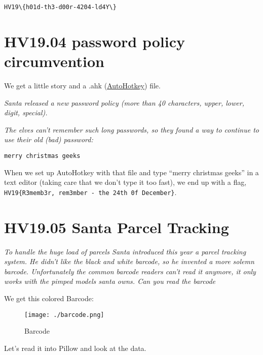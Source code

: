 \documentclass[11pt]{article}
\begin{document}
    \begin{Verbatim}[commandchars=\\\{\}]
HV19\{h01d-th3-d00r-4204-ld4Y\}
    \end{Verbatim}
    
\pagebreak{}
    \hypertarget{hv19.04-password-policy-circumvention}{%
\section{HV19.04 password policy
circumvention}\label{hv19.04-password-policy-circumvention}}

We get a little story and a .ahk
(\href{https://www.autohotkey.com/}{AutoHotkey}) file.

\emph{Santa released a new password policy (more than 40 characters,
upper, lower, digit, special).}

\emph{The elves can't remember such long passwords, so they found a way
to continue to use their old (bad) password:}

\texttt{merry\ christmas\ geeks}

    When we set up AutoHotkey with that file and type ``merry christmas
geeks'' in a text editor (taking care that we don't type it too fast),
we end up with a flag,
\texttt{HV19\{R3memb3r,\ rem3mber\ -\ the\ 24th\ 0f\ December\}}.

    
\pagebreak{}
    \hypertarget{hv19.05-santa-parcel-tracking}{%
\section{HV19.05 Santa Parcel
Tracking}\label{hv19.05-santa-parcel-tracking}}

\emph{To handle the huge load of parcels Santa introduced this year a
parcel tracking system. He didn't like the black and white barcode, so
he invented a more solemn barcode. Unfortunately the common barcode
readers can't read it anymore, it only works with the pimped models
santa owns. Can you read the barcode}

We get this colored Barcode:

\begin{figure}
\centering
\texttt{[image: ./barcode.png]}
\caption{Barcode}
\end{figure}

Let's read it into Pillow and look at the data.
\end{document}
